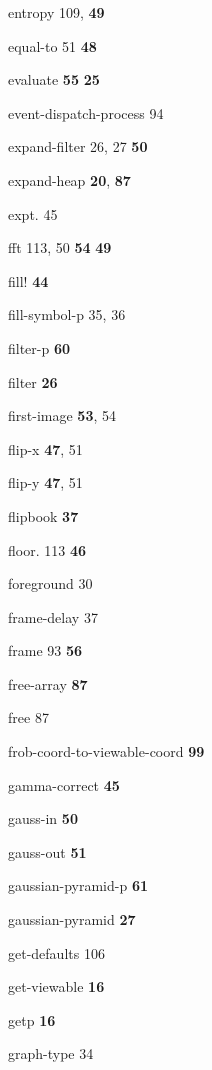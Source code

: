 \begin{theindex}
\item {\ptt entropy} 109, {\bf 49}
\item {\ptt equal-to} 51
 {\bf 48}
\item {\ptt evaluate} {\bf 55}
 {\bf 25}
\item {\ptt event-dispatch-process} 94
\item {\ptt expand-filter} 26, 27
 {\bf 50}
\item {\ptt expand-heap} {\bf 20}, {\bf 87}
\item {\ptt expt.} 45
\item {\ptt fft} 113, 50
 {\bf 54}
 {\bf 49}
\item {\ptt fill!}
 {\bf 44}
\item {\ptt fill-symbol-p} 35, 36
\item {\ptt filter-p} {\bf 60}
\item {\ptt filter} {\bf 26}
\item {\ptt first-image} {\bf 53}, 54
\item {\ptt flip-x} {\bf 47}, 51
\item {\ptt flip-y} {\bf 47}, 51
\item {\ptt flipbook} {\bf 37}
\item {\ptt floor.} 113
 {\bf 46}
\item {\ptt foreground} 30
\item {\ptt frame-delay} 37
\item {\ptt frame} 93
 {\bf 56}
\item {\ptt free-array} {\bf 87}
\item {\ptt free} 87
\item {\ptt frob-coord-to-viewable-coord} {\bf 99}
\item {\ptt gamma-correct}
 {\bf 45}
\item {\ptt gauss-in}
 {\bf 50}
\item {\ptt gauss-out}
 {\bf 51}
\item {\ptt gaussian-pyramid-p} {\bf 61}
\item {\ptt gaussian-pyramid} {\bf 27}
\item {\ptt get-defaults} 106
\item {\ptt get-viewable} {\bf 16}
\item {\ptt getp} {\bf 16}
\item {\ptt graph-type} 34

\end{theindex}
